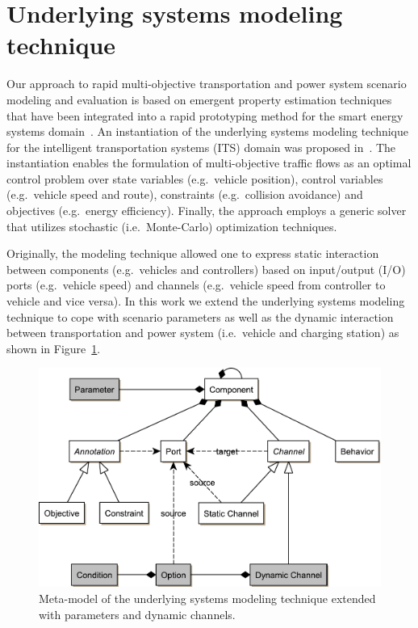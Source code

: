 \section{Underlying systems modeling technique}
\label{section:foundation}

Our approach to rapid multi-objective transportation and power system scenario modeling and evaluation is based on emergent property estimation techniques \cite{hackenberg2012towards} that have been integrated into a rapid prototyping method for the smart energy systems domain~\cite{hackenberg2014rapid}. An instantiation of the underlying systems modeling technique for the intelligent transportation systems (ITS) domain was proposed in~\cite{ascher2014early}. The instantiation enables the formulation of multi-objective traffic flows as an optimal control problem over state variables (e.g.\ vehicle position), control variables (e.g.\ vehicle speed and route), constraints (e.g.\ collision avoidance) and objectives (e.g.\ energy efficiency). Finally, the approach employs a generic solver that utilizes stochastic (i.e.\ Monte-Carlo) optimization techniques.

Originally, the modeling technique allowed one to express static interaction between components (e.g.\ vehicles and controllers) based on input/output (I/O) ports (e.g.\ vehicle speed) and channels (e.g.\ vehicle speed from controller to vehicle and vice versa). In this work we extend the underlying systems modeling technique to cope with scenario parameters as well as the dynamic interaction between transportation and power system (i.e.\ vehicle and charging station) as shown in Figure~\ref{fig:meta_model}.

\begin{figure}[h]
	\centering
	\includegraphics[width=\columnwidth]{../gfx/meta_model.pdf}
	\caption{Meta-model of the underlying systems modeling technique extended with parameters and dynamic channels.}
	\label{fig:meta_model}
\end{figure}

